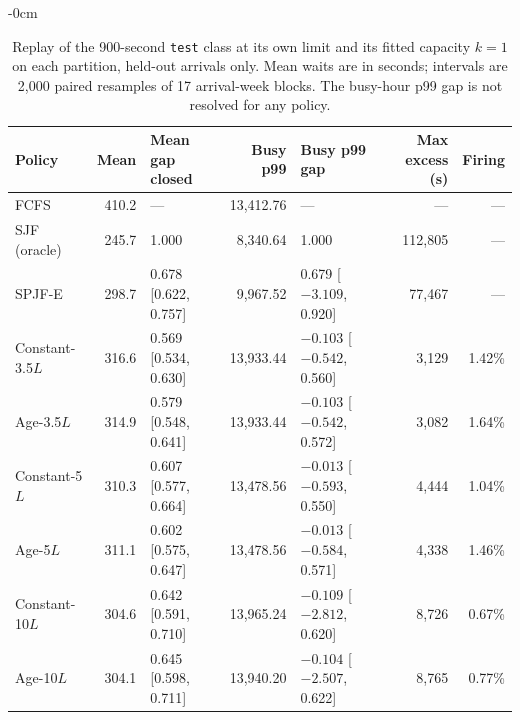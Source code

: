 \documentclass[mathematics,supfile,submit,moreauthors]{Definitions/mdpi}
\newcommand{\devnum}[1]{#1}
\begin{document}
\begin{table}[htbp]
\centering\small
\caption{Replay of the \devnum{900}-second \texttt{test} class at its own limit and its
fitted capacity $k=\devnum{1}$ on each partition, held-out arrivals only. Mean waits are
in seconds; intervals are \devnum{2{,}000} paired resamples of \devnum{17} arrival-week
blocks. The busy-hour p99 gap is not resolved for any policy.}
\label{tab:s_lpc_replay}
\begin{adjustwidth}{-\extralength}{0cm}
\centering
\begin{tabular}{lrlrlrr}
\toprule
Policy & Mean & Mean gap closed & Busy p99 & Busy p99 gap & Max excess (s) & Firing \\
\midrule
FCFS & \devnum{410.2} & --- & \devnum{13{,}412.76} & --- & --- & --- \\
SJF (oracle) & \devnum{245.7} & \devnum{1.000} & \devnum{8{,}340.64} & \devnum{1.000} & \devnum{112{,}805} & --- \\
SPJF-E & \devnum{298.7} & \devnum{0.678} [\devnum{0.622}, \devnum{0.757}] & \devnum{9{,}967.52} & \devnum{0.679} [\devnum{$-3.109$}, \devnum{0.920}] & \devnum{77{,}467} & --- \\
Constant-\devnum{3.5}$L$ & \devnum{316.6} & \devnum{0.569} [\devnum{0.534}, \devnum{0.630}] & \devnum{13{,}933.44} & \devnum{$-0.103$} [\devnum{$-0.542$}, \devnum{0.560}] & \devnum{3{,}129} & \devnum{1.42\%} \\
Age-\devnum{3.5}$L$ & \devnum{314.9} & \devnum{0.579} [\devnum{0.548}, \devnum{0.641}] & \devnum{13{,}933.44} & \devnum{$-0.103$} [\devnum{$-0.542$}, \devnum{0.572}] & \devnum{3{,}082} & \devnum{1.64\%} \\
Constant-\devnum{5}$L$ & \devnum{310.3} & \devnum{0.607} [\devnum{0.577}, \devnum{0.664}] & \devnum{13{,}478.56} & \devnum{$-0.013$} [\devnum{$-0.593$}, \devnum{0.550}] & \devnum{4{,}444} & \devnum{1.04\%} \\
Age-\devnum{5}$L$ & \devnum{311.1} & \devnum{0.602} [\devnum{0.575}, \devnum{0.647}] & \devnum{13{,}478.56} & \devnum{$-0.013$} [\devnum{$-0.584$}, \devnum{0.571}] & \devnum{4{,}338} & \devnum{1.46\%} \\
Constant-\devnum{10}$L$ & \devnum{304.6} & \devnum{0.642} [\devnum{0.591}, \devnum{0.710}] & \devnum{13{,}965.24} & \devnum{$-0.109$} [\devnum{$-2.812$}, \devnum{0.620}] & \devnum{8{,}726} & \devnum{0.67\%} \\
Age-\devnum{10}$L$ & \devnum{304.1} & \devnum{0.645} [\devnum{0.598}, \devnum{0.711}] & \devnum{13{,}940.20} & \devnum{$-0.104$} [\devnum{$-2.507$}, \devnum{0.622}] & \devnum{8{,}765} & \devnum{0.77\%} \\
\bottomrule
\end{tabular}
\end{adjustwidth}
\end{table}
\end{document}
